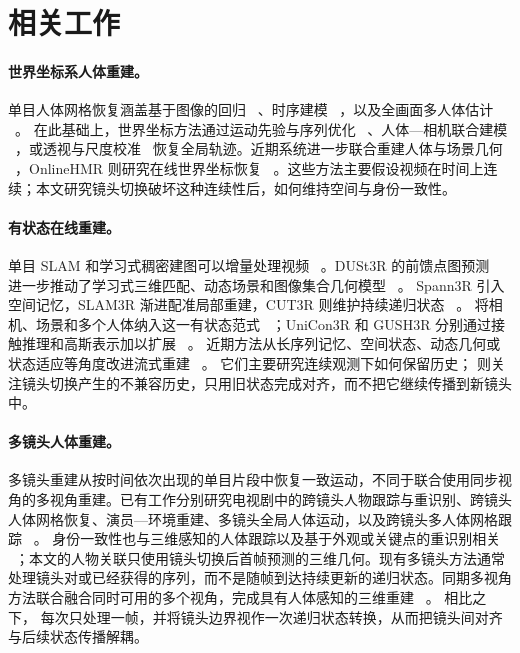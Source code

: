 \section{相关工作}

\paragraph{世界坐标系人体重建。}
单目人体网格恢复涵盖基于图像的回归
~\citep{kanazawa2018hmr}、时序建模
~\citep{kocabas2020vibe,goel2023humans4d}，以及全画面多人体估计
~\citep{sun2021romp,sun2022bev,sun2023trace,baradel2024multihmr,wang2025prompthmr,sun2024aios}。
在此基础上，世界坐标方法通过运动先验与序列优化
~\citep{yuan2022glamr,ye2023slahmr,kocabas2024pace,li2024coin}、人体—相机联合建模
~\citep{wang2024tram,shin2024wham,shen2024gvhmr,yin2024whac}，或透视与尺度校准
~\citep{patel2025camerahmr,yang2025checkerboards}恢复全局轨迹。近期系统进一步联合重建人体与场景几何
~\citep{muller2025reconstructing,liu2026josh,zhang2025odhsr,li2026unish}，OnlineHMR 则研究在线世界坐标恢复
~\citep{zhao2026onlinehmr}。这些方法主要假设视频在时间上连续；本文研究镜头切换破坏这种连续性后，如何维持空间与身份一致性。

\paragraph{有状态在线重建。}
单目 SLAM 和学习式稠密建图可以增量处理视频
~\citep{teed2021droidslam,sun2021neuralrecon}。DUSt3R 的前馈点图预测
~\citep{wang2024dust3r}
进一步推动了学习式三维匹配、动态场景和图像集合几何模型
~\citep{leroy2024mast3r,zhang2025monst3r,wang2025vggt}。
Spann3R 引入空间记忆，SLAM3R 渐进配准局部重建，CUT3R 则维护持续递归状态
~\citep{wang2025spann3r,liu2025slam3r,wang2025cut3r}。
\humanthree{} 将相机、场景和多个人体纳入这一有状态范式
~\citep{chen2026human3r}；UniCon3R 和 GUSH3R 分别通过接触推理和高斯表示加以扩展
~\citep{sur2026unicon3r,abe2026gush3r}。
近期方法从长序列记忆、空间状态、动态几何或状态适应等角度改进流式重建
~\citep{chen2025long3r,wu2025point3r,zhuo2025st4r,chen2026ttt3r,zheng2026ttsa3r,li2026recal3r}。
它们主要研究连续观测下如何保留历史；\method{} 则关注镜头切换产生的不兼容历史，只用旧状态完成对齐，而不把它继续传播到新镜头中。

\paragraph{多镜头人体重建。}
多镜头重建从按时间依次出现的单目片段中恢复一致运动，不同于联合使用同步视角的多视角重建。已有工作分别研究电视剧中的跨镜头人物跟踪与重识别、跨镜头人体网格恢复、演员—环境重建、多镜头全局人体运动，以及跨镜头多人体网格跟踪
~\citep{pavlakos2022tvtracking,pavlakos2022multishot,pavlakos2022tvreconstruction,zhang2025humanmm,on2026multithumbs,kim2025showmak3r}。
身份一致性也与三维感知的人体跟踪以及基于外观或关键点的重识别相关
~\citep{rajasegaran2022phalp,he2021transreid,yuan2025pose2id,somers2024kpr}；本文的人物关联只使用镜头切换后首帧预测的三维几何。现有多镜头方法通常处理镜头对或已经获得的序列，而不是随帧到达持续更新的递归状态。同期多视角方法联合融合同时可用的多个视角，完成具有人体感知的三维重建
~\citep{rojas2025hamst3r,yang2026feedforward,liu2026trophies}。
相比之下，\method{} 每次只处理一帧，并将镜头边界视作一次递归状态转换，从而把镜头间对齐与后续状态传播解耦。
